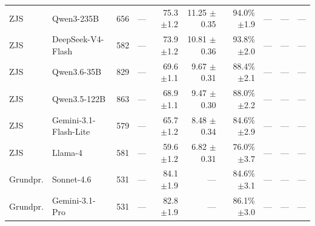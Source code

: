 \begin{table}[t]
{\begin{tabular}{llrrrrrrrr}
ZJS & Qwen3-235B & 656 & --- & \shortstack[r]{75.3\\{\scriptsize $\pm$1.2}} & \shortstack[r]{11.25\\{\scriptsize $\pm$0.35}} & \shortstack[r]{94.0\%\\{\scriptsize $\pm$1.9}} & --- & --- & --- \\
ZJS & DeepSeek-V4-Flash & 582 & --- & \shortstack[r]{73.9\\{\scriptsize $\pm$1.2}} & \shortstack[r]{10.81\\{\scriptsize $\pm$0.36}} & \shortstack[r]{93.8\%\\{\scriptsize $\pm$2.0}} & --- & --- & --- \\
ZJS & Qwen3.6-35B & 829 & --- & \shortstack[r]{69.6\\{\scriptsize $\pm$1.1}} & \shortstack[r]{9.67\\{\scriptsize $\pm$0.31}} & \shortstack[r]{88.4\%\\{\scriptsize $\pm$2.1}} & --- & --- & --- \\
ZJS & Qwen3.5-122B & 863 & --- & \shortstack[r]{68.9\\{\scriptsize $\pm$1.1}} & \shortstack[r]{9.47\\{\scriptsize $\pm$0.30}} & \shortstack[r]{88.0\%\\{\scriptsize $\pm$2.2}} & --- & --- & --- \\
ZJS & Gemini-3.1-Flash-Lite & 579 & --- & \shortstack[r]{65.7\\{\scriptsize $\pm$1.2}} & \shortstack[r]{8.48\\{\scriptsize $\pm$0.34}} & \shortstack[r]{84.6\%\\{\scriptsize $\pm$2.9}} & --- & --- & --- \\
ZJS & Llama-4 & 581 & --- & \shortstack[r]{59.6\\{\scriptsize $\pm$1.2}} & \shortstack[r]{6.82\\{\scriptsize $\pm$0.31}} & \shortstack[r]{76.0\%\\{\scriptsize $\pm$3.7}} & --- & --- & --- \\
\midrule
Grundpr. & Sonnet-4.6 & 531 & --- & \shortstack[r]{84.1\\{\scriptsize $\pm$1.9}} & --- & \shortstack[r]{84.6\%\\{\scriptsize $\pm$3.1}} & --- & --- & --- \\
Grundpr. & Gemini-3.1-Pro & 531 & --- & \shortstack[r]{82.8\\{\scriptsize $\pm$1.9}} & --- & \shortstack[r]{86.1\%\\{\scriptsize $\pm$3.0}} & --- & --- & --- \\

\end{tabular}}
\end{table}
